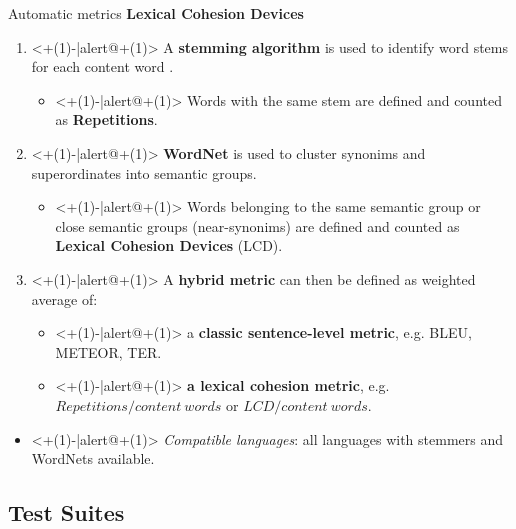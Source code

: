 \begin{frame}{Automatic metrics}
	\textbf{Lexical Cohesion Devices} \cite{wong_extending_2012}
	\begin{enumerate}
		\item<+(1)-|alert@+(1)> A \textbf{stemming algorithm} \cite{porter_algorithm_1980} is used to identify word stems for each content word  . 
		\begin{itemize}
			\item<+(1)-|alert@+(1)> Words with the same stem are defined and counted as \textbf{Repetitions}.
		\end{itemize}
		\item<+(1)-|alert@+(1)> \textbf{WordNet} \cite{fellbaum_semantic_1998} is used to cluster synonims and superordinates into  semantic groups.
		\begin{itemize}
			\item<+(1)-|alert@+(1)> Words belonging to the same semantic group or close semantic groups (near-synonims) are defined and counted as \textbf{Lexical Cohesion Devices} (LCD).
		\end{itemize}
		\item<+(1)-|alert@+(1)> A \textbf{hybrid metric} can then be defined as weighted average of:		
			\begin{itemize}
				\item<+(1)-|alert@+(1)> a \textbf{classic sentence-level metric}, e.g. BLEU, METEOR, TER.
				\item<+(1)-|alert@+(1)> \textbf{a lexical cohesion metric}, e.g. $Repetitions / content\ words$ or $LCD / content\ words$.
			\end{itemize}
	\end{enumerate}
	\begin{itemize}
		\item<+(1)-|alert@+(1)> \textit{Compatible languages}: all languages with stemmers and WordNets available.
	\end{itemize}
\end{frame}


\subsection{Test Suites}

